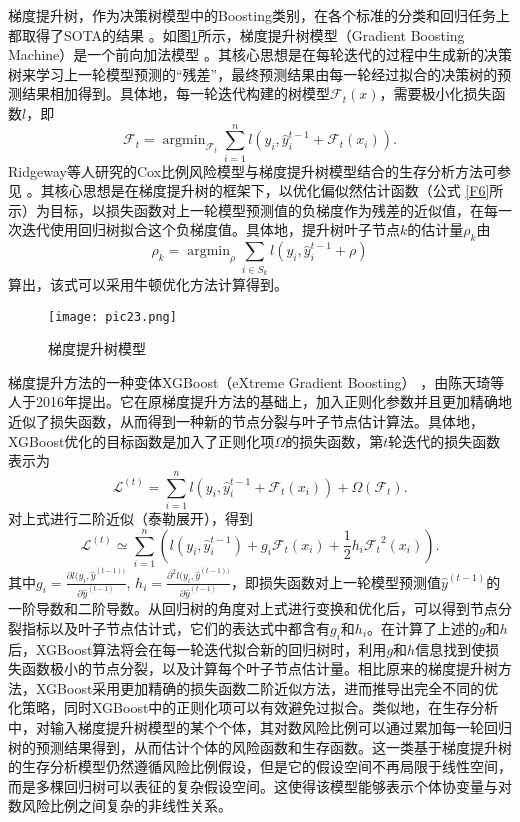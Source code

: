 梯度提升树，作为决策树模型中的Boosting类别，在各个标准的分类和回归任务上都取得了SOTA的结果 。如图\ref{pic23}所示，梯度提升树模型（Gradient Boosting Machine）是一个前向加法模型 。其核心思想是在每轮迭代的过程中生成新的决策树来学习上一轮模型预测的“残差”，最终预测结果由每一轮经过拟合的决策树的预测结果相加得到。具体地，每一轮迭代构建的树模型$\mathcal{F}_t (x)$，需要极小化损失函数$l$，即
\begin{equation}
\mathcal{F}_t = \mathop{\arg\min}_{\mathcal{F}_t} \sum_{i=1}^n l(y_i, \hat{y}_i^{t-1} + \mathcal{F}_t(x_i)). \label{F9}
\end{equation}
Ridgeway等人研究的Cox比例风险模型与梯度提升树模型结合的生存分析方法可参见 \cite{Ridgeway2007gbm, Binder2008Allowing}。其核心思想是在梯度提升树的框架下，以优化偏似然估计函数（公式 \eqref{F6}所示）为目标，以损失函数对上一轮模型预测值的负梯度作为残差的近似值，在每一次迭代使用回归树拟合这个负梯度值。具体地，提升树叶子节点$k$的估计量$\rho_k$由
\begin{equation}
\rho_k = \mathop{\arg\min}_{\rho} \sum_{i\in S_k} l(y_i, \hat{y}_i^{t-1} + \rho) \label{F10}
\end{equation}算出，该式可以采用牛顿优化方法计算得到。

\begin{figure}[H]
\texttt{[image: pic23.png]}
\caption{梯度提升树模型}
\label{pic23}
\end{figure}

梯度提升方法的一种变体XGBoost（eXtreme Gradient Boosting） ，由陈天琦等人于2016年提出。它在原梯度提升方法的基础上，加入正则化参数并且更加精确地近似了损失函数，从而得到一种新的节点分裂与叶子节点估计算法。具体地，XGBoost优化的目标函数是加入了正则化项$\Omega$的损失函数，第$t$轮迭代的损失函数表示为 
\begin{equation}
\mathcal{L}^{(t)} = \sum_{i=1}^n l(y_i, \hat{y}_i^{t-1} + \mathcal{F}_t(x_i)) + \Omega(\mathcal{F}_t). \label{F11}
\end{equation}
对上式进行二阶近似（泰勒展开），得到
\begin{equation}
\mathcal{L}^{(t)} \simeq \sum_{i=1}^n \left( l(y_i, \hat{y}_i^{t-1})+g_i\mathcal{F}_t(x_i)+\frac{1}{2} h_i {\mathcal{F}_t}^2 (x_i) \right). \label{F12}
\end{equation}
其中$g_i=\frac{\partial l(y_i, \hat{y}^{(t-1))}}{\partial \hat{y}^{(t-1)}}$, $h_i=\frac{\partial^2 l(y_i, \hat{y}^{(t-1))}}{\partial \hat{y}^{(t-1)}}$，即损失函数对上一轮模型预测值$\hat{y}^{(t-1)}$的一阶导数和二阶导数。从回归树的角度对上式进行变换和优化后，可以得到节点分裂指标以及叶子节点估计式，它们的表达式中都含有$g_i$和$h_i$。在计算了上述的$g$和$h$后，XGBoost算法将会在每一轮迭代拟合新的回归树时，利用$g$和$h$信息找到使损失函数极小的节点分裂，以及计算每个叶子节点估计量。相比原来的梯度提升树方法，XGBoost采用更加精确的损失函数二阶近似方法，进而推导出完全不同的优化策略，同时XGBoost中的正则化项可以有效避免过拟合。类似地，在生存分析中，对输入梯度提升树模型的某个个体，其对数风险比例可以通过累加每一轮回归树的预测结果得到，从而估计个体的风险函数和生存函数。这一类基于梯度提升树的生存分析模型仍然遵循风险比例假设，但是它的假设空间不再局限于线性空间，而是多棵回归树可以表征的复杂假设空间。这使得该模型能够表示个体协变量与对数风险比例之间复杂的非线性关系。

